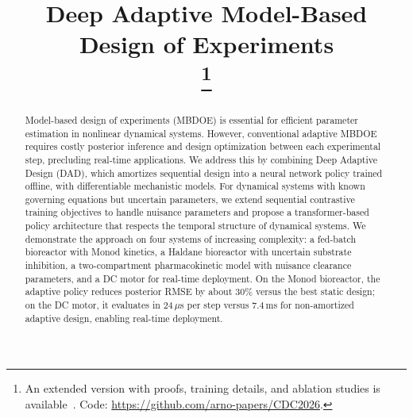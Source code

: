 \documentclass[conference]{IEEEtran}
\newif\ifextended
\begin{document}
\title{\vspace*{26pt}Deep Adaptive Model-Based Design of Experiments\\
\thanks{\ifextended This work has been submitted to the IEEE for possible publication. Copyright may be transferred without notice, after which this version may no longer be accessible. This is the extended version; a six-page conference paper has been submitted to the 2026 IEEE Conference on Decision and Control (CDC).\else An extended version with proofs, training details, and ablation studies is available~\cite{strouwen2026extended}.\fi{} Code: \protect\url{https://github.com/arno-papers/CDC2026}.}
}

\author{
\and
{}
}

\maketitle

\begin{abstract}
Model-based design of experiments (MBDOE) is essential for efficient parameter estimation in nonlinear dynamical systems. However, conventional adaptive MBDOE requires costly posterior inference and design optimization between each experimental step, precluding real-time applications. We address this by combining Deep Adaptive Design (DAD), which amortizes sequential design into a neural network policy trained offline, with differentiable mechanistic models. For dynamical systems with known governing equations but uncertain parameters, we extend sequential contrastive training objectives to handle nuisance parameters and propose a transformer-based policy architecture that respects the temporal structure of dynamical systems. We demonstrate the approach on four systems of increasing complexity: a fed-batch bioreactor with Monod kinetics, a Haldane bioreactor with uncertain substrate inhibition, a two-compartment pharmacokinetic model with nuisance clearance parameters, and a DC motor for real-time deployment. On the Monod bioreactor, the adaptive policy reduces posterior RMSE by about 30\% versus the best static design; on the DC motor, it evaluates in $24\,\mu$s per step versus $7.4\,$ms for non-amortized adaptive design, enabling real-time deployment.
\end{abstract}
\end{document}
